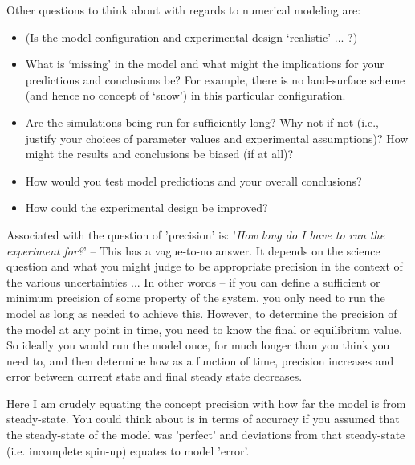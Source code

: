 \vspace{1mm}
\noindent Other questions to think about with regards to numerical modeling are:

\begin{itemize}[noitemsep]
\setlength{\itemindent}{.2in}
\vspace{1mm}
\item  (Is the model configuration and experimental design ‘realistic’ ... ?)
\vspace{1mm}
\item  What is ‘missing’ in the model and what might the implications for your predictions and conclusions be? For example, there is no land-surface scheme (and hence no concept of ‘snow’) in this particular configuration.
\vspace{1mm}
\item Are the simulations being run for sufficiently long? Why not if not (i.e., justify your choices of parameter values and experimental assumptions)? How might the results and conclusions be biased (if at all)?
\vspace{1mm}
\item How would you test model predictions and your overall conclusions?
\vspace{1mm}
\item How could the experimental design be improved?
\end{itemize}

\vspace{1mm}
\noindent Associated with the question of 'precision' is: '\textit{How long do I have to run the experiment for?}' -- This has a vague-to-no answer. It depends on the science question and what you might judge to be appropriate precision in the context of the various uncertainties ... In other words -- if you can define a sufficient or minimum precision of some property of the system, you only need to run the model as long as needed to achieve this. However, to determine  the precision of the model at any point in time, you need to know the final or equilibrium value. So ideally you would run the model once, for much longer than you think you need to, and then determine how as a function of time, precision increases and error between current state and final steady state decreases.

Here I am crudely equating the concept precision with how far the model is from steady-state. You could think about is in terms of accuracy if you assumed that the steady-state of the model was 'perfect' and deviations from that steady-state (i.e. incomplete spin-up) equates to model 'error'.

